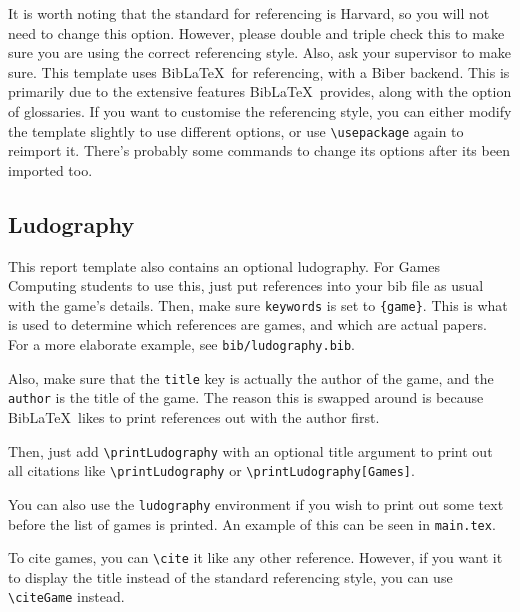 It is worth noting that the standard for referencing is Harvard, so you will not need to change this option. However, please double and triple check this to make sure you are using the correct referencing style. Also, ask your supervisor to make sure. This template uses Bib\LaTeX~for referencing, with a Biber backend. This is primarily due to the extensive features Bib\LaTeX~provides, along with the option of glossaries. If you want to customise the referencing style, you can either modify the template slightly to use different options, or use \texttt{\textbackslash usepackage} again to reimport it. There's probably some commands to change its options after its been imported too.

\subsection{Ludography}
This report template also contains an optional ludography. For Games Computing students to use this, just put references into your bib file as usual with the game's details. Then, make sure \texttt{keywords} is set to \texttt{\{game\}}. This is what is used to determine which references are games, and which are actual papers. For a more elaborate example, see \texttt{bib/ludography.bib}.

Also, make sure that the \texttt{title} key is actually the author of the game, and the \texttt{author} is the title of the game. The reason this is swapped around is because Bib\LaTeX~likes to print references out with the author first.

Then, just add \texttt{\textbackslash printLudography} with an optional title argument to print out all citations like \texttt{\textbackslash printLudography} or \texttt{\textbackslash printLudography[Games]}.

You can also use the \texttt{ludography} environment if you wish to print out some text before the list of games is printed. An example of this can be seen in \texttt{main.tex}.

To cite games, you can \texttt{\textbackslash cite} it like any other reference. However, if you want it to display the title instead of the standard referencing style, you can use \texttt{\textbackslash citeGame} instead.
